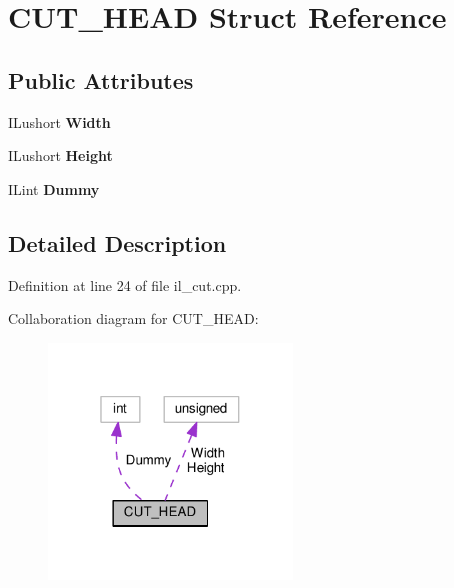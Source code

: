 \hypertarget{structCUT__HEAD}{}\section{C\+U\+T\+\_\+\+H\+E\+AD Struct Reference}
\label{structCUT__HEAD}
\subsection*{Public Attributes}
\begin{DoxyCompactItemize}
\item 
\mbox{\label{structCUT__HEAD_a9ff13a216083856a33dab7deef271a46}} 
I\+Lushort {\bfseries Width}
\item 
\mbox{\label{structCUT__HEAD_ad251737d5f7dd51ea66f4e9933c73a49}} 
I\+Lushort {\bfseries Height}
\item 
\mbox{\label{structCUT__HEAD_ac428d0196446d1b75ff3a5e4199130bc}} 
I\+Lint {\bfseries Dummy}
\end{DoxyCompactItemize}


\subsection{Detailed Description}


Definition at line 24 of file il\+\_\+cut.\+cpp.



Collaboration diagram for C\+U\+T\+\_\+\+H\+E\+AD\+:
\nopagebreak
\begin{figure}[H]
\begin{center}
\leavevmode
\includegraphics[width=184pt]{d9/d25/structCUT__HEAD__coll__graph}
\end{center}
\end{figure}


